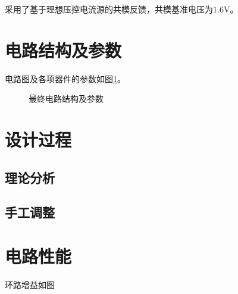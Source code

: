 \documentclass[a4paper]{article}
\newcommand{\uV}{\si{\volt}}
\begin{document}
采用了基于理想压控电流源的共模反馈，共模基准电压为$1.6\uV$。

\newpage

\section{电路结构及参数}


电路图及各项器件的参数如图\ref{circuit}。
\begin{figure}[htb!]
  \centering
  
  \caption{最终电路结构及参数}
  \label{circuit}
\end{figure}

\newpage


\section{设计过程}
\subsection{理论分析}

\subsection{手工调整}

\newpage

\section{电路性能}
环路增益如图
\end{document}
